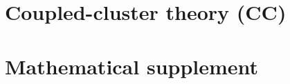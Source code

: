 \documentclass{report}
\theoremstyle{plain}
\theoremstyle{definition}
\begin{document}
\chapter{Coupled-cluster theory (CC)}
\label{sec:cc}




\appendix
\chapter{Mathematical supplement}
\label{ch:mathematical-supplement}




%





\end{document}
